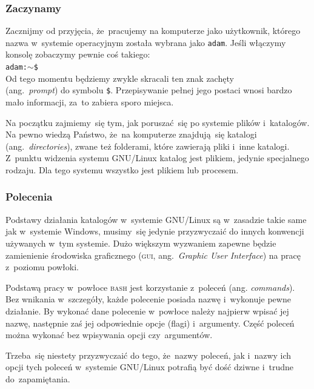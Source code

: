 \documentclass[10pt,t]{beamer}
\begin{document}
\begin{frame}
  \frametitle{Zaczynamy}


  Zacznijmy od przyjęcia, że~pracujemy na komputerze jako użytkownik,
  którego nazwa w~systemie operacyjnym została wybrana jako \texttt{adam}.
  Jeśli włączymy konsolę zobaczymy pewnie coś takiego: \\
  \texttt{adam:$\sim$\$} \\
  Od tego momentu będziemy zwykle skracali ten znak zachęty \\
  (ang.~\textit{prompt}) do symbolu \texttt{\$}. Przepisywanie pełnej jego
  postaci wnosi bardzo mało informacji, za~to zabiera sporo miejsca.

  Na początku zajmiemy~się tym, jak poruszać~się po systemie plików
  i~katalogów. Na pewno wiedzą Państwo, że~na komputerze znajdują~się
  katalogi (ang.~\textit{directories}), zwane też folderami, które zawierają
  pliki i~inne katalogi. Z~punktu widzenia systemu GNU/Linux
  katalog jest plikiem, jedynie specjalnego rodzaju. Dla tego systemu
  wszystko jest plikiem lub procesem.

\end{frame}





\begin{frame}
  \frametitle{Polecenia}


  Podstawy działania katalogów w~systemie GNU/Linux są w~zasadzie takie
  same jak w~systemie Windows, musimy~się jedynie przyzwyczaić do innych
  konwencji używanych w~tym systemie. Dużo większym wyzwaniem zapewne
  będzie zamienienie środowiska graficznego (\textsc{gui},
  ang.~\textit{Graphic User Interface}) na pracę z~poziomu powłoki.

  Podstawą pracy w~powłoce \textsc{bash} jest korzystanie z~poleceń (ang.
  \textit{commands}). Bez wnikania w~szczegóły, każde polecenie posiada
  nazwę i~wykonuje pewne działanie. By wykonać dane polecenie w~powłoce
  należy najpierw wpisać jej nazwę, następnie zaś jej odpowiednie
  opcje (flagi) i~argumenty. Część poleceń można wykonać bez wpisywania
  opcji czy~argumentów.

  Trzeba~się niestety przyzwyczaić do tego, że~nazwy poleceń, jak i~nazwy
  ich opcji tych poleceń w~systemie GNU/Linux potrafią być dość dziwne
  i~trudne do~zapamiętania.

\end{frame}
\end{document}
